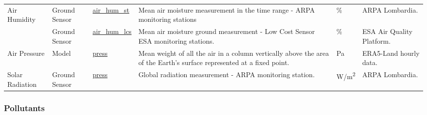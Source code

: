 \begin{center}
\begin{longtable}{ |p{2cm}|p{1.5cm}|p{2.3cm}|p{4cm}|p{1cm}|p{2cm}| }
\multirow{2}{4em}{Air Humidity} & Ground \newline Sensor  & \underline{air\_hum\_st} & Mean air moisture measurement in the time range - ARPA monitoring stations & \% & ARPA \newline Lombardia.\\ 
& Ground \newline Sensor  & \underline{air\_hum\_lcs} &  Mean air moisture ground measurement - Low Cost Sensor ESA monitoring stations. & \% & ESA Air Quality Platform.\\ \hline

\multirow{1}{4em}{Air Pressure} & Model   & \underline{press} & Mean weight of all the air in a column vertically above the area of the Earth's surface represented at a fixed point. & Pa & ERA5-Land hourly data.\\ \hline

\multirow{1}{4em}{Solar Radiation} & Ground \newline Sensor  & \underline{press} & Global radiation measurement - ARPA monitoring station. & W/m\textsuperscript{2} & ARPA \newline Lombardia.\\ \hline

\hline
\end{longtable}
\end{center}
\subsubsection{Pollutants}


